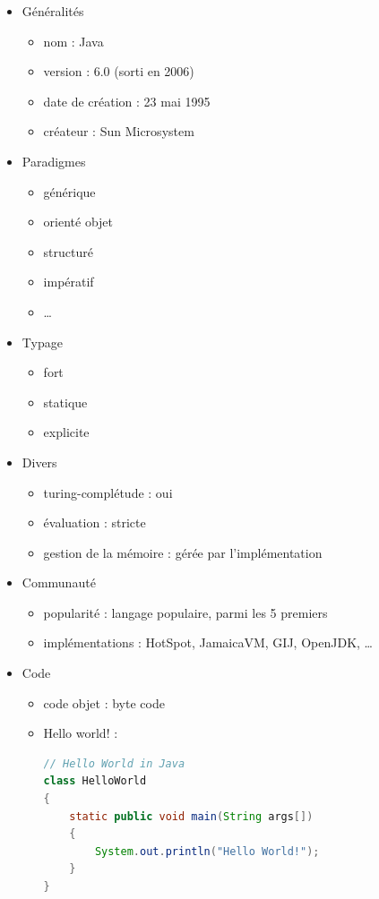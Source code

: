 \renewcommand{\labelitemi}{\textbullet}
\begin{itemize}
\item Généralités
	\begin{itemize}
	\item nom : Java
	\item version : 6.0 (sorti en 2006)
	\item date de création : 23 mai 1995
	\item créateur : Sun Microsystem\\
	\end{itemize}
\item Paradigmes
	\begin{itemize}
	\item générique
	\item orienté objet
	\item structuré
	\item impératif
	\item …\\
	\end{itemize}
\item Typage
	\begin{itemize}
	\item fort
	\item statique
	\item explicite\\
	\end{itemize}
\item Divers
	\begin{itemize}
	\item turing-complétude : oui
	\item évaluation : stricte
	\item gestion de la mémoire : gérée par l'implémentation\\
	\end{itemize}
\item Communauté
	\begin{itemize}
	\item popularité : langage populaire, parmi les 5 premiers
	\item implémentations : HotSpot, JamaicaVM, GIJ, OpenJDK, …\\
	\end{itemize}
\item Code
	\begin{itemize}
	\item code objet : byte code
	\item Hello world! :
\begin{lstlisting}[language=java]
// Hello World in Java
class HelloWorld
{
    static public void main(String args[])
    {
        System.out.println("Hello World!");
    }
}
\end{lstlisting}
	\end{itemize}
\end{itemize}

